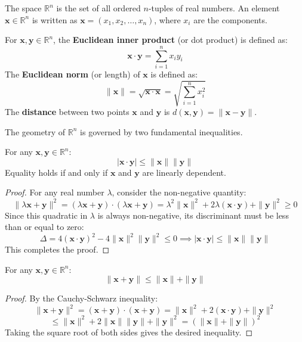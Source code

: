 The space $\mathbb{R}^n$ is the set of all ordered $n$-tuples of real numbers. An element $\mathbf{x} \in \mathbb{R}^n$ is written as $\mathbf{x} = (x_1, x_2, \dots, x_n)$, where $x_i$ are the components.

\begin{definition}
For $\mathbf{x}, \mathbf{y} \in \mathbb{R}^n$, the \textbf{Euclidean inner product} (or dot product) is defined as:
\[ \mathbf{x} \cdot \mathbf{y} = \sum_{i=1}^n x_i y_i \]
The \textbf{Euclidean norm} (or length) of $\mathbf{x}$ is defined as:
\[ \|\mathbf{x}\| = \sqrt{\mathbf{x} \cdot \mathbf{x}} = \sqrt{\sum_{i=1}^n x_i^2} \]
The \textbf{distance} between two points $\mathbf{x}$ and $\mathbf{y}$ is $d(\mathbf{x}, \mathbf{y}) = \|\mathbf{x} - \mathbf{y}\|$.
\end{definition}

The geometry of $\mathbb{R}^n$ is governed by two fundamental inequalities.

\begin{theorem}
For any $\mathbf{x}, \mathbf{y} \in \mathbb{R}^n$:
\[ |\mathbf{x} \cdot \mathbf{y}| \le \|\mathbf{x}\| \|\mathbf{y}\| \]
Equality holds if and only if $\mathbf{x}$ and $\mathbf{y}$ are linearly dependent.
\end{theorem}

\begin{proof}
For any real number $\lambda$, consider the non-negative quantity:
\[ \|\lambda \mathbf{x} + \mathbf{y}\|^2 = (\lambda \mathbf{x} + \mathbf{y}) \cdot (\lambda \mathbf{x} + \mathbf{y}) = \lambda^2 \|\mathbf{x}\|^2 + 2\lambda (\mathbf{x} \cdot \mathbf{y}) + \|\mathbf{y}\|^2 \ge 0 \]
Since this quadratic in $\lambda$ is always non-negative, its discriminant must be less than or equal to zero:
\[ \Delta = 4(\mathbf{x} \cdot \mathbf{y})^2 - 4\|\mathbf{x}\|^2 \|\mathbf{y}\|^2 \le 0 \implies |\mathbf{x} \cdot \mathbf{y}| \le \|\mathbf{x}\| \|\mathbf{y}\| \]
This completes the proof.
\end{proof}

\begin{theorem}
For any $\mathbf{x}, \mathbf{y} \in \mathbb{R}^n$:
\[ \|\mathbf{x} + \mathbf{y}\| \le \|\mathbf{x}\| + \|\mathbf{y}\| \]
\end{theorem}

\begin{proof}
By the Cauchy-Schwarz inequality:
\[ \|\mathbf{x} + \mathbf{y}\|^2 = (\mathbf{x} + \mathbf{y}) \cdot (\mathbf{x} + \mathbf{y}) = \|\mathbf{x}\|^2 + 2(\mathbf{x} \cdot \mathbf{y}) + \|\mathbf{y}\|^2 \]
\[ \le \|\mathbf{x}\|^2 + 2\|\mathbf{x}\| \|\mathbf{y}\| + \|\mathbf{y}\|^2 = (\|\mathbf{x}\| + \|\mathbf{y}\|)^2 \]
Taking the square root of both sides gives the desired inequality.
\end{proof}

